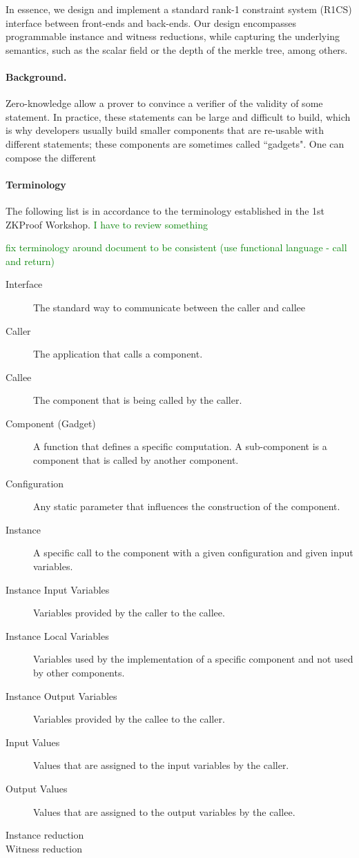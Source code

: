 \documentclass[a4paper,11pt]{article}
\newcommand\anote[1]{\textcolor{green}{#1}}
\newcommand\dtodo[1]{\todo[color=red!20]{#1}}
\begin{document}
		In essence, we design and implement a standard rank-1 constraint system (R1CS) interface between front-ends and back-ends. Our design encompasses programmable instance and witness reductions, while capturing the underlying semantics, such as the scalar field or the depth of the merkle tree, among others.

		\dtodo{Review the introduction}
		
		\paragraph{Background.} Zero-knowledge allow a prover to convince a verifier of the validity of some statement. In practice, these statements can be large and difficult to build, which is why developers usually build smaller components that are re-usable with different statements; these components are sometimes called ``gadgets". One can compose the different 
		
		
		\paragraph{Terminology}
		The following list is in accordance to the terminology established in the 1st ZKProof Workshop. \anote{I have to review something}
		
		\anote{fix terminology around document to be consistent (use functional language - call and return)}
		
		\begin{description}
			\item [Interface] The standard way to communicate between the caller and callee
			\item [Caller] The application that calls a component. 
			\item [Callee] The component that is being called by the caller.
			\item [Component (Gadget)] A function that defines a specific computation. A sub-component is a component that is called by another component.
			\item [Configuration] Any static parameter that influences the construction of the component. 
			\item [Instance] A specific call to the component with a given configuration and given input variables.
			\item [Instance Input Variables] Variables provided by the caller to the callee.
			\item [Instance Local Variables] Variables used by the implementation of a specific component and not used by other components.
			\item [Instance Output Variables] Variables provided by the callee to the caller.
			\item [Input Values] Values that are assigned to the input variables by the caller.
			\item [Output Values] Values that are assigned to the output variables by the callee.
			\item [Instance reduction]
			\item [Witness reduction]
		\end{description}
		
\end{document}
